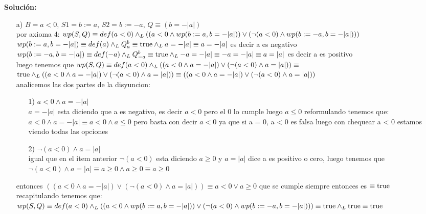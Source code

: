 \documentclass{article}
\begin{document}
\textbf{Soluci\'on:}
\begin{enumerate}
	\item [a)] $B = a < 0$, $S1 = b := a$, $S2 = b := -a$, $Q \equiv (b = -|a|)$\\
	por axioma 4: $wp(S,Q) \equiv def(a < 0) \land _L ((a < 0 \land wp(b := a, b = -|a|)) \lor (\lnot (a < 0) \land wp(b := -a, b = -|a|)))$\\
	$wp(b := a, b = -|a|) \equiv def(a) \land _L Q^{b}_{a} \equiv \mathrm{true} \land _L a = -|a| \equiv a = -|a|$ es decir a es negativo\\
	$wp(b := -a, b = -|a|) \equiv def(-a) \land _L Q^{b}_{-a} \equiv \mathrm{true} \land _L -a = -|a| \equiv -a = -|a| \equiv a = |a|$ es decir a es positivo\\
	luego tenemos que $wp(S,Q) \equiv def(a < 0) \land _L ((a < 0 \land a = -|a|) \lor (\lnot (a < 0) \land a = |a|)) \equiv$\\
	$\mathrm{true} \land _L ((a < 0 \land a = -|a|) \lor (\lnot (a < 0) \land a = |a|))
	\equiv ((a < 0 \land a = -|a|) \lor (\lnot (a < 0) \land a = |a|))$\\
	analicemos las dos partes de la disyuncion:
	\begin{itemize}
		\item [1)] $a < 0 \land a = -|a|$\\
		$a = -|a|$ esta diciendo que a es negativo, es decir $a<0$ pero el 0 lo cumple luego $a \leq 0$ reformulando tenemos que: $a < 0 \land a = -|a| \equiv a < 0 \land a \leq 0$ pero basta con decir $a < 0$ ya que si a = 0, a < 0 es falsa luego con chequear a < 0 estamos viendo todas las opciones
		\item [2)] $\lnot (a < 0) \land a = |a|$\\
		igual que en el item anterior $\lnot (a < 0)$ esta diciendo $a \geq 0$ y $a = |a|$ dice a es positivo o cero, luego tenemos que $ \lnot (a < 0) \land a = |a| \equiv a \geq 0 \land a \geq 0 \equiv a \geq 0$
	\end{itemize}
	entonces $((a < 0 \land a = -|a|) \lor (\lnot (a < 0) \land a = |a|)) \equiv a < 0 \lor a \geq 0$ que se cumple siempre entonces es $\equiv \mathrm{true}$\\
	recapitulando tenemos que: $wp(S,Q) \equiv def(a < 0) \land _L ((a < 0 \land wp(b := a, b = -|a|)) \lor (\lnot (a < 0) \land wp(b := -a, b = -|a|))) \equiv \\
	\mathrm{true} \land _L \mathrm{true} \equiv \mathrm{true}$


\end{enumerate}
\end{document}
